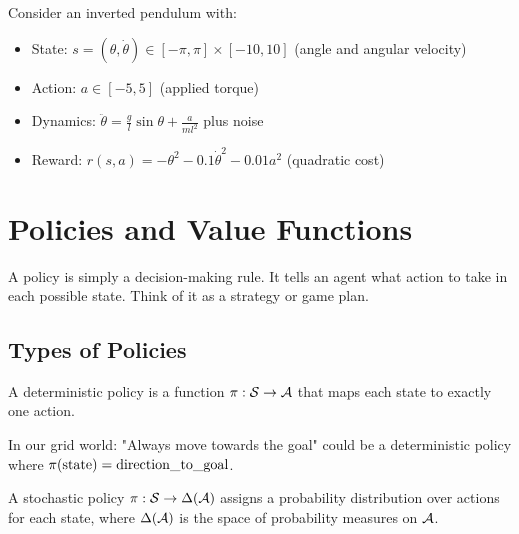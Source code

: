 \begin{examplebox}
Consider an inverted pendulum with:
\begin{itemize}
    \item State: $s = (\theta, \dot{\theta}) \in [-\pi, \pi] \times [-10, 10]$ (angle and angular velocity)
    \item Action: $a \in [-5, 5]$ (applied torque)
    \item Dynamics: $\ddot{\theta} = \frac{g}{l}\sin\theta + \frac{a}{ml^2}$ plus noise
    \item Reward: $r(s,a) = -\theta^2 - 0.1\dot{\theta}^2 - 0.01a^2$ (quadratic cost)
\end{itemize}
\end{examplebox}

\section{Policies and Value Functions}

\begin{intuitionbox}
A policy is simply a decision-making rule. It tells an agent what action to take in each possible state. Think of it as a strategy or game plan.
\end{intuitionbox}

\subsection{Types of Policies}

\begin{definition}
A deterministic policy is a function $\pi: \mathcal{S} \to \mathcal{A}$ that maps each state to exactly one action.
\end{definition}

\begin{examplebox}
In our grid world: "Always move towards the goal" could be a deterministic policy where $\pi(\text{state}) = \text{direction\_to\_goal}$.
\end{examplebox}

\begin{definition}
A stochastic policy $\pi: \mathcal{S} \to \Delta(\mathcal{A})$ assigns a probability distribution over actions for each state, where $\Delta(\mathcal{A})$ is the space of probability measures on $\mathcal{A}$.
\end{definition}

